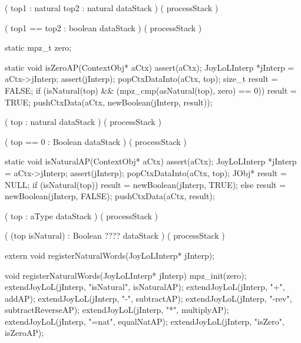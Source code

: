 \starttyping

\startWord[equal]

\preDataStack
  (
    top1 : natural
    top2 : natural
    dataStack
  )
\preProcessStack
  ( processStack )
\preConditions
\stopPreConditions

\postDataStack
  (
    top1 == top2 : boolean
    dataStack
  )
\postProcessStack
  ( processStack )
\postConditions
\stopPostConditions

\stopWord

\stoptyping

\startCCode
static  mpz_t zero;

static void isZeroAP(ContextObj* aCtx) {
  assert(aCtx);
  JoyLoLInterp *jInterp = aCtx->jInterp;
  assert(jInterp);
  popCtxDataInto(aCtx, top);
  size_t result = FALSE;
  if (isNatural(top) &&
      (mpz_cmp(asNatural(top), zero) == 0)) result = TRUE;
  pushCtxData(aCtx, newBoolean(jInterp, result));
}
\stopCCode

\starttyping

\startWord[isZero]

\preDataStack
  (
    top : natural
    dataStack
  )
\preProcessStack
  ( processStack )
\preConditions
\stopPreConditions

\postDataStack
  (
    top == 0 : Boolean
    dataStack
  )
\postProcessStack
  ( processStack )
\postConditions
\stopPostConditions

\stopWord

\stoptyping

\startCCode
static void isNaturalAP(ContextObj* aCtx) {
  assert(aCtx);
  JoyLoLInterp *jInterp = aCtx->jInterp;
  assert(jInterp);
  popCtxDataInto(aCtx, top);
  JObj* result = NULL;
  if (isNatural(top))
    result = newBoolean(jInterp, TRUE);
  else
    result = newBoolean(jInterp, FALSE);
  pushCtxData(aCtx, result);
}
\stopCCode

\starttyping

\startWord[isNatural]

\preDataStack
  (
    top : aType
    dataStack
  )
\preProcessStack
  ( processStack )
\preConditions
\stopPreConditions

\postDataStack
  ( 
    (top isNatural) : Boolean ????
    dataStack
  )
\postProcessStack
  ( processStack )
\postConditions
\stopPostConditions

\stopWord

\stoptyping

\startCHeader
extern void registerNaturalWords(JoyLoLInterp* jInterp);
\stopCHeader
{}

\startCCode
void registerNaturalWords(JoyLoLInterp* jInterp) {
  mpz_init(zero);
  extendJoyLoL(jInterp, "isNatural", isNaturalAP);
  extendJoyLoL(jInterp, "+",         addAP);
  extendJoyLoL(jInterp, "-",         subtractAP);
  extendJoyLoL(jInterp, "-rev",      subtractReverseAP);
  extendJoyLoL(jInterp, "*",         multiplyAP);
  extendJoyLoL(jInterp, "=nat",      equalNatAP);
  extendJoyLoL(jInterp, "isZero",    isZeroAP);
}
\stopCCode
